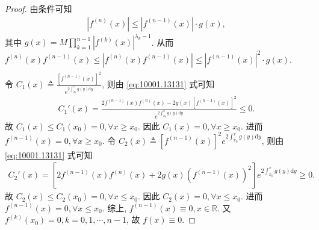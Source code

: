 \documentclass[../../main.tex]{subfiles}
\begin{document}
\begin{proof}
由条件可知
\begin{align*}
|f^{(n)}(x)| \leqslant |f^{(n-1)}(x)| \cdot g(x),
\end{align*}
其中 $g(x) = M \prod_{k=1}^{n-1} |f^{(k)}(x)|^{\lambda_k - 1}$. 从而 $f^{(n)}(x) f^{(n-1)}(x) \leqslant |f^{(n)}(x) f^{(n-1)}(x)| \leqslant |f^{(n-1)}(x)|^2 \cdot g(x)$.
\begin{align}
\label{eq:10001.13131}
\end{align}
令 $C_1(x) \triangleq \frac{[f^{(n-1)}(x)]^2}{e^{2\int_{x_0}^x g(y) \mathrm{d}y}}$, 则由 \eqref{eq:10001.13131} 式可知
\begin{align*}
C_1'(x) = \frac{2f^{(n-1)}(x) f^{(n)}(x) - 2g(x) [f^{(n-1)}(x)]^2}{e^{2\int_{x_0}^x g(y) \mathrm{d}y}} \leqslant 0.
\end{align*}
故 $C_1(x) \leqslant C_1(x_0) = 0, \forall x \geqslant x_0$. 因此 $C_1(x) = 0, \forall x \geqslant x_0$. 进而 $f^{(n-1)}(x) = 0, \forall x \geqslant x_0$.
令 $C_2(x) \triangleq [f^{(n-1)}(x)]^2 e^{2\int_{x_0}^x g(y) \mathrm{d}y}$, 则由 \eqref{eq:10001.13131} 式可知
\begin{align*}
C_2'(x) = \left[ 2f^{(n-1)}(x) f^{(n)}(x) + 2g(x) (f^{(n-1)}(x))^2 \right] e^{2\int_{x_0}^x g(y) \mathrm{d}y} \geqslant 0.
\end{align*}
故 $C_2(x) \leqslant C_2(x_0) = 0, \forall x \leqslant x_0$. 因此 $C_2(x) = 0, \forall x \leqslant x_0$. 进而 $f^{(n-1)}(x) = 0, \forall x \leqslant x_0$.
综上, $f^{(n-1)}(x) \equiv 0, x \in \mathbb{R}$. 又 $f^{(k)}(x_0) = 0, k = 0, 1, \cdots, n-1$, 故 $f(x) \equiv 0$.
\end{proof}
\end{document}
